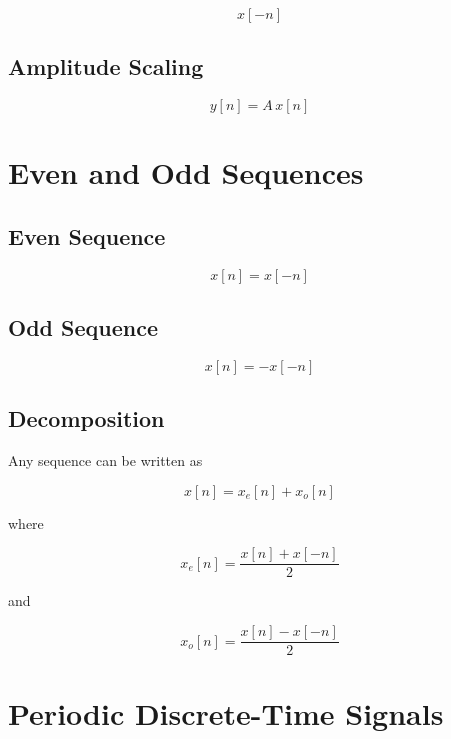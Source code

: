 \[
\boxed{
x[-n]
}
\]


\subsection{Amplitude Scaling}

\[
\boxed{
y[n]=A\,x[n]
}
\]


\section{Even and Odd Sequences}


\subsection{Even Sequence}

\[
\boxed{
x[n]=x[-n]
}
\]


\subsection{Odd Sequence}

\[
\boxed{
x[n]=-x[-n]
}
\]


\subsection{Decomposition}

Any sequence can be written as

\[
\boxed{
x[n]=x_e[n]+x_o[n]
}
\]

where

\[
\boxed{
x_e[n]=\frac{x[n]+x[-n]}{2}
}
\]

and

\[
\boxed{
x_o[n]=\frac{x[n]-x[-n]}{2}
}
\]


\section{Periodic Discrete-Time Signals}

